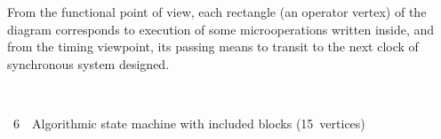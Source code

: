 \begin{multicols}{2}
From the functional point of view, each rectangle (an operator vertex) of the diagram corresponds to
execution of some microoperations written inside, and from the timing viewpoint,
its passing means to transit to
the next clock of synchronous system designed.\linebreak
   
  \medskip

\vspace*{1pt}
\begin{center}
\mbox{%
\epsfxsize=80.3mm
}
\end{center}
\vspace*{3pt}
{\figurename~6}\ \ {\small Algorithmic state machine with included blocks (15~vertices)}
\bigskip
\addtocounter{figure}{1}

\end{multicols}

\begin{figure} %
\vspace*{1pt}
\begin{center}
\mbox{%
\epsfxsize=128.767mm
}
\end{center}
\vspace*{-9pt}
\end{figure}

